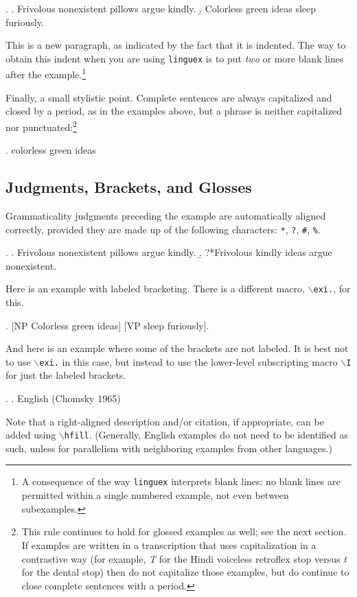 \documentclass[letterpaper,12pt, twoside]{article}
\begin{document}
\ex. 
\a. Frivolous nonexistent pillows argue kindly.
\b. Colorless green ideas sleep furiously.


This is a new paragraph, as indicated by the fact that it is indented. The way to obtain this indent when you are using \texttt{linguex} is to put \emph{two} or more blank lines after the example.\footnote{A consequence of the way  \texttt{linguex} interprets blank lines: no blank lines are permitted within a single numbered example, not even between subexamples.} 

Finally, a small stylistic point. Complete sentences are always capitalized  and closed by a period, as in the examples above, but a phrase is neither capitalized nor punctuated:\footnote{This rule continues to hold for glossed examples as well; see the next section. If examples are written in a transcription that uses capitalization in a contrastive way (for example, \emph{T} for the Hindi voiceless retroflex stop versus \emph{t} for the dental stop) then do not capitalize those examples, but do continue to close complete sentences with a period.}

\ex. colorless green ideas


\subsection{Judgments, Brackets, and Glosses}\label{secjbg}



Grammaticality judgments preceding the example are automatically aligned correctly, provided they are made up of the following characters: \texttt{*}, \texttt{?}, \texttt{\#}, \texttt{\%}.

\ex. 
\a. Frivolous nonexistent pillows argue kindly.
\b. ?*Frivolous  kindly ideas argue nonexistent.


Here is an example with labeled bracketing. There is a different macro, \texttt{$\backslash$exi.}, for this.

\exi. [NP Colorless green ideas] [VP sleep furiously].

And here is an example where some of the brackets are not labeled. It is best not to use \texttt{$\backslash$exi.} in this case, but instead to use the lower-level subscripting macro \texttt{$\backslash$I} for just the labeled brackets.

\ex. . \hfill English (Chomsky 1965)

Note that a right-aligned description and/or citation, if appropriate, can be added using \texttt{$\backslash$hfill}. (Generally, English examples do not need to be identified as such, unless for parallelism with neighboring examples from other languages.)
\end{document}
